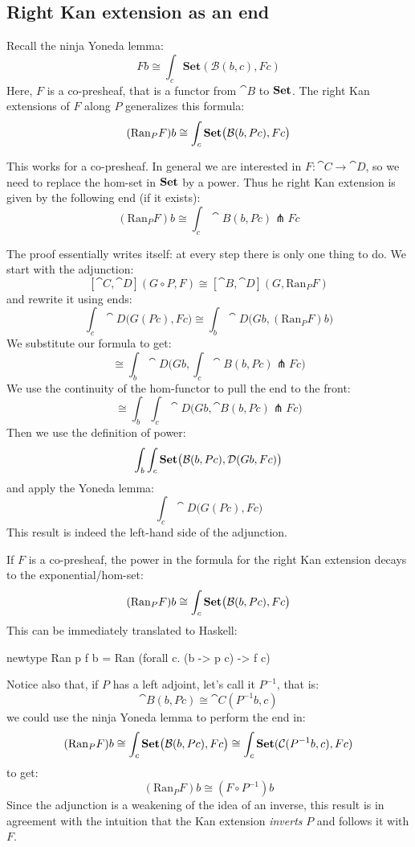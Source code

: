 \documentclass[DaoFP]{subfiles}
\begin{document}
\subsection{Right Kan extension as an end}

Recall the ninja Yoneda lemma:
\[ F b \cong \int_{c} \mathbf{Set} (\mathcal{B}(b, c), F c) \]
Here, $F$ is a co-presheaf, that is a functor from $\cat B$ to $\mathbf{Set}$. The right Kan extensions of $F$ along $P$ generalizes this formula:
\[ (\text{Ran}_P F) b \cong \int_c \mathbf{Set} \big( \mathcal{B} (b, P c), F c\big) \]

This works for a co-presheaf. In general we are interested in $F \colon \cat C \to \cat D$, so we need to replace the hom-set in $\mathbf{Set}$ by a power. Thus he right Kan extension is given by the following end (if it exists):
 \[ (\text{Ran}_P F) b \cong \int_c \cat B (b, P c) \pitchfork F c \]
 
 The proof essentially writes itself: at every step there is only one thing to do. We start with the adjunction:
  \[ [\cat C, \cat D](G \circ P, F) \cong [\cat B, \cat D](G, \text{Ran}_P F) \]
and rewrite it using ends:
 \[ \int_c \cat D \big(G ( P c), F c\big) \cong \int_b \cat D\big(G b, (\text{Ran}_P F) b\big) \]
We substitute our formula to get:
 \[ \cong  \int_b \cat D\big(G b,\int_c \cat B (b, P c) \pitchfork F c \big)\]
We use the continuity of the hom-functor to pull the end to the front:
\[  \cong  \int_b \int_c \cat D\big(G b, \cat B (b, P c) \pitchfork F c \big) \]
Then we use the definition of power:
\[ \int_b \int_c \mathbf{Set} \big(  \mathcal{B} (b, P c), \mathcal{D} (G b, F c) \big) \]
and apply the Yoneda lemma:
\[ \int_c  \cat D \big(G (P c), F c\big) \]
This result is indeed the left-hand side of the adjunction.
 
If $F$ is a co-presheaf, the power in the formula for the right Kan extension decays to the exponential/hom-set:
  \[ (\text{Ran}_P F) b \cong \int_c \mathbf{Set} \big( \mathcal{B} (b, P c), F c\big) \]
This can be immediately translated to Haskell:
 \begin{haskell}
 newtype Ran p f b = Ran (forall c. (b -> p c) -> f c)
 \end{haskell}
 
 Notice also that, if $P$ has a left adjoint, let's call it $P^{-1}$, that is:
 \[ \cat B(b, P c) \cong \cat C(P^{-1} b, c) \]
 we could use the ninja Yoneda lemma to perform the end in:
 \[ (\text{Ran}_P F) b \cong \int_c \mathbf{Set} \big( \mathcal{B} (b, P c), F c\big) \cong \int_c \mathbf{Set}(\mathcal{C}(P^{-1} b, c), F c)\]
to get:
 \[  (\text{Ran}_P F) b \cong (F \circ P^{-1}) b \]
 Since the adjunction is a weakening of the idea of an inverse, this result is in agreement with the intuition that the Kan extension \emph{inverts} $P$ and follows it with $F$.
 
\end{document}
